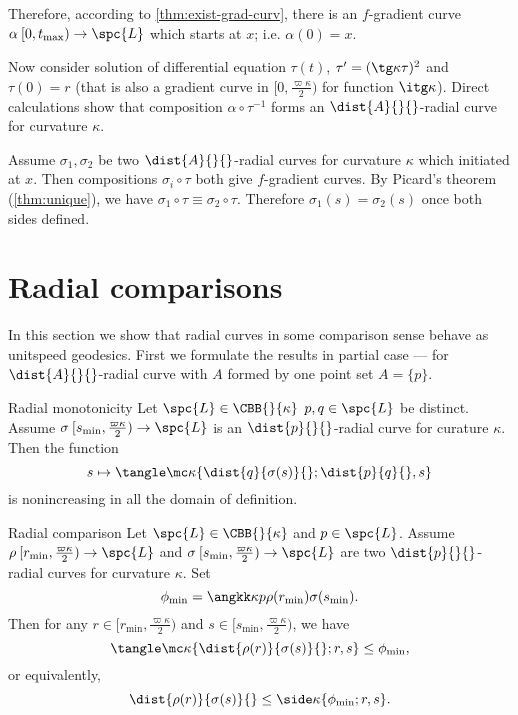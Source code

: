 Therefore, according to \ref{thm:exist-grad-curv}, there is an $f$-gradient curve $\alpha\:[0,t_{\max})\to \spc{L}$ which starts at $x$; i.e. $\alpha(0)=x$.

Now consider solution of differential equation $\tau(t)$, $\tau'=(\tg\kappa\tau)^2$ and $\tau(0)=r$ 
(that is also a gradient curve in $[0,\tfrac{\varpi\kappa}2)$ for function $\itg\kappa$).
Direct calculations show that composition $\alpha\circ\tau^{-1}$ 
forms an $\dist{A}{}{}$-radial curve for curvature $\kappa$.

 Assume $\sigma_1,\sigma_2$ be two $\dist{A}{}{}$-radial curves for curvature $\kappa$ which initiated at $x$.
Then compositions $\sigma_i\circ\tau$ both give $f$-gradient curves.
By Picard's theorem (\ref{thm:unique}), we have
$\sigma_1\circ\tau 
\equiv 
\sigma_2\circ\tau$.
Therefore $\sigma_1(s)=\sigma_2(s)$ once both sides defined.
\qeds










\section{Radial comparisons}\label{sec:rad-curv}

In this section we show that radial curves in some comparison sense behave as unitspeed geodesics.
First we formulate the results in partial case --- for $\dist{A}{}{}$-radial curve with $A$ formed by one point set $A=\{p\}$.

\begin{thm}{Radial monotonicity}\label{rad-mon}
Let $\spc{L}\in\CBB{}{\kappa}$ 
$p, q\in \spc{L}$ be distinct.
Assume $\sigma\:  [s_{\min},\tfrac{\varpi\kappa}2)\to \spc{L}$
is an $\dist{p}{}{}$-radial curve for curature $\kappa$.
Then the function 
$$s\mapsto 
\tangle\mc\kappa\{
\dist{q}{\sigma(s)}{};
\dist{p}{q}{},
s
\}$$
is nonincreasing in all the domain of definition.
\end{thm}

\begin{thm}{Radial comparison}\label{rad-comp}
Let $\spc{L}\in\CBB{}{\kappa}$ 
and $p\in \spc{L}$.
Assume $\rho\:  [r_{\min},\tfrac{\varpi\kappa}2)\to \spc{L}$
and    $\sigma\:[s_{\min},\tfrac{\varpi\kappa}2)\to \spc{L}$
are two $\dist{p}{}{}$-radial curves for curvature $\kappa$.
Set
$$\phi_{\min}=\angkk\kappa p{\rho(r_{\min})}{\sigma(s_{\min})}.
$$
Then for any $r\in[r_{\min},\tfrac{\varpi\kappa}2)$ and  $s\in[s_{\min},\tfrac{\varpi\kappa}2)$,
we have
$$
\tangle\mc\kappa\{\dist{\rho(r)}{\sigma(s)}{};r,s\}
\le \phi_{\min},
$$
or equivalently,
$$
\dist{\rho(r)}{\sigma(s)}{}
\le \side\kappa\{\phi_{\min};r,s\}.
$$

\end{thm}

